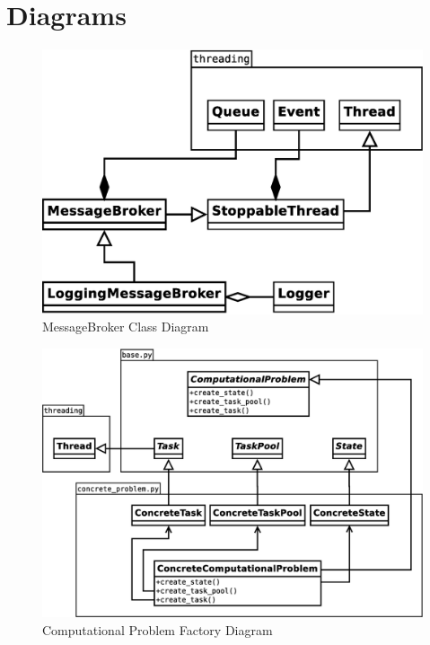 \documentclass{article}
\begin{document}
\section{Diagrams}
\begin{figure}[H]
	\centering
	\includegraphics[width=\linewidth]{diagrams/BrokerDiagram.eps}
	\caption{MessageBroker Class Diagram}
\end{figure}

\begin{figure}[H]
	\centering
	\includegraphics[width=\linewidth]{diagrams/FactoryDiagram.eps}
	\caption{Computational Problem Factory Diagram}
\end{figure}
\end{document}
